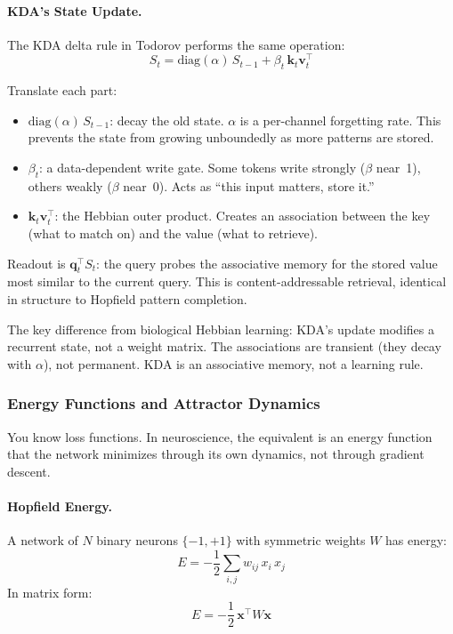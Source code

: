 \documentclass[11pt,a4paper]{article}
\begin{document}
\paragraph{KDA's State Update.}

The KDA delta rule in Todorov performs the same operation:
\[
  S_t = \mathrm{diag}(\alpha) \, S_{t-1} + \beta_t \, \mathbf{k}_t \mathbf{v}_t^\top
\]

Translate each part:
\begin{itemize}
  \item $\mathrm{diag}(\alpha) \, S_{t-1}$: decay the old state. $\alpha$ is a per-channel forgetting rate. This prevents the state from growing unboundedly as more patterns are stored.
  \item $\beta_t$: a data-dependent write gate. Some tokens write strongly ($\beta$ near~1), others weakly ($\beta$ near~0). Acts as ``this input matters, store it.''
  \item $\mathbf{k}_t \mathbf{v}_t^\top$: the Hebbian outer product. Creates an association between the key (what to match on) and the value (what to retrieve).
\end{itemize}

Readout is $\mathbf{q}_t^\top S_t$: the query probes the associative memory for the stored value most similar to the current query. This is content-addressable retrieval, identical in structure to Hopfield pattern completion.

The key difference from biological Hebbian learning: KDA's update modifies a recurrent state, not a weight matrix. The associations are transient (they decay with $\alpha$), not permanent. KDA is an associative memory, not a learning rule.

\subsubsection{Energy Functions and Attractor Dynamics}

You know loss functions. In neuroscience, the equivalent is an energy function that the network minimizes through its own dynamics, not through gradient descent.

\paragraph{Hopfield Energy.}

A network of $N$ binary neurons $\{-1, +1\}$ with symmetric weights $W$ has energy:
\[
  E = -\frac{1}{2} \sum_{i,j} w_{ij}\, x_i\, x_j
\]
In matrix form:
\[
  E = -\frac{1}{2}\, \mathbf{x}^\top W \mathbf{x}
\]
\end{document}
